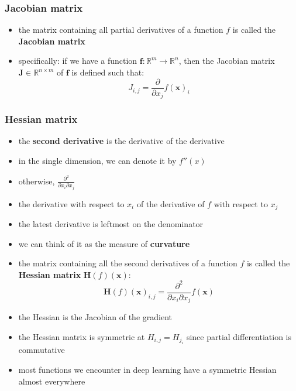 \documentclass[11pt, twocolumn]{report}
\def\realnumbers{\mathbb{R}}
\begin{document}
\subsubsection{Jacobian matrix}
\begin{itemize}
  \item the matrix containing all partial derivatives of a function $f$ is
    called the \textbf{Jacobian matrix}
  \item specifically: if we have a function $\bm{f} : \realnumbers^m \to
    \realnumbers^n$, then the Jacobian matrix $\bm{J} \in \realnumbers^{n
      \times m}$ of $\bm{f}$ is defined such that:
    \begin{equation}
      J_{i, j} = \frac{\partial}{\partial x_j} f(\bm{x})_i
    \end{equation}
\end{itemize}

\subsubsection{Hessian matrix}
\begin{itemize}
  \item the \textbf{second derivative} is the derivative of the derivative
  \item in the single dimension, we can denote it by $f''(x)$
  \item otherwise, $\frac{\partial^2}{\partial x_i \partial x_j}$
  \item the derivative with respect to $x_i$ of the derivative of $f$ with
    respect to $x_j$
  \item the latest derivative is leftmost on the denominator
  \item we can think of it as the measure of \textbf{curvature}
  \item the matrix containing all the second derivatives of a function $f$ is
    called the \textbf{Hessian matrix} $\bm{H}(f)(\bm{x})$:   
    \begin{equation}
      \bm{H}(f)(\bm{x})_{i, j} = \frac{\partial^2}{\partial x_i \partial x_j}
      f(\bm{x})
    \end{equation}
  \item the Hessian is the Jacobian of the gradient
  \item the Hessian matrix is symmetric at $H_{i, j} = H_{j_i}$ since partial
    differentiation is commutative
  \item most functions we encounter in deep learning have a symmetric Hessian
    almost everywhere
\end{itemize}
\end{document}
